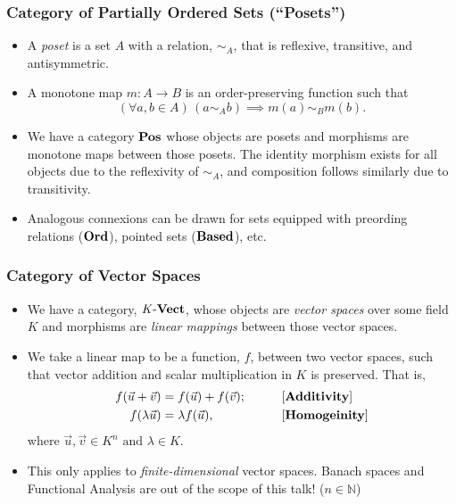 \documentclass{beamer}
\numberwithin{figure}{section}
\begin{document}
\begin{frame}
        \frametitle{Category of Partially Ordered Sets (``Posets'')}
        \begin{itemize}
                \item A \emph{poset} is a set $A$ with a relation, $\sim_A$,
                        that is reflexive, transitive, and antisymmetric.
                \item A monotone map $m \colon A \to B $ is an
                        order-preserving function such that
                        \begin{equation*}
                                (\forall a, b\in A)\,(a \sim_A b)
                                \implies m(a) \sim_B m(b).
                        \end{equation*}
                \item We have a category $\operatorname{\text{\textbf{Pos}}}$ whose objects are posets and
                        morphisms are monotone maps between those posets. The
                        identity morphism exists for all objects due to the
                        reflexivity of $\sim_A$, and composition follows
                        similarly due to transitivity.
                \item Analogous connexions can be drawn for sets equipped with
                        preording relations ($\operatorname{\text{\textbf{Ord}}}$), pointed sets
                        ($\operatorname{\text{\textbf{Based}}}$), etc.
        \end{itemize}
\end{frame}

\begin{frame}
        \frametitle{Category of Vector Spaces}
        \begin{itemize}
                \item We have a category, $\operatorname{\mathit{K}-\text{\textbf{Vect}}}$, whose objects are
                        \emph{vector spaces} over some field $K$ and morphisms
                        are \emph{linear mappings} between those vector spaces.
                \item We take a linear map to be a function, $f$, between two
                        vector spaces, such that vector addition and scalar
                        multiplication in $K$ is preserved. That is,
                        \begin{alignat*}{2}
                                f(\vec{u}+\vec{v}) &= f(\vec{u})+f(\vec{v});
                                \qquad && \text{[\textbf{Additivity}]} \\
                                f(\lambda\vec{u}) &= \lambda f(\vec{u}),
                                \qquad && \text{[\textbf{Homogeinity}]}
                        \end{alignat*}
                        where $\vec{u},\vec{v}\in K^n \text{ and }\lambda\in K$.
                \item This only applies to \emph{finite-dimensional} vector
                        spaces. Banach spaces and Functional Analysis are out of
                        the scope of this talk! ($n\in\mathbb{N}$)
        \end{itemize}
\end{frame}
\end{document}
